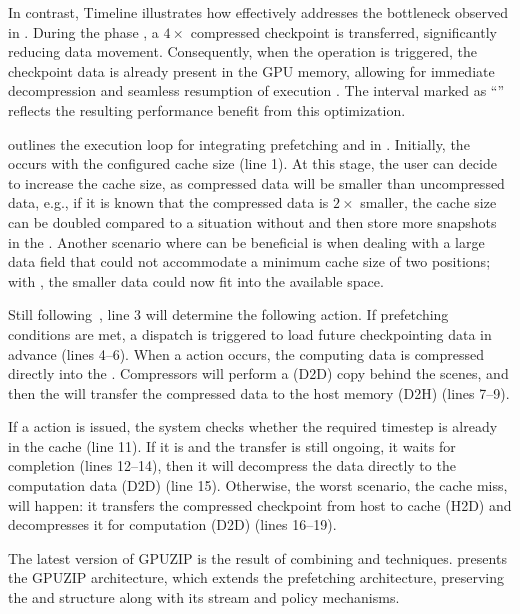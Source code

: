 \documentclass[Ingles]{ic-tese-v3}
\begin{document}
In contrast, Timeline  illustrates how \compression effectively addresses the bottleneck observed in . During the  phase , a $4\times$ compressed checkpoint is transferred, significantly reducing \htd data movement. Consequently, when the \restore operation  is triggered, the checkpoint data is already present in the GPU memory, allowing for immediate decompression and seamless resumption of execution . The interval marked as ``'' reflects the resulting performance benefit from this optimization.

 outlines the execution loop for integrating prefetching and \compression in \awave. Initially, the  occurs with the configured cache size (line 1). At this stage, the user can decide to increase the cache size, as compressed data will be smaller than uncompressed data, e.g., if it is known that the compressed data is $2\times$ smaller, the cache size can be doubled compared to a situation without \compression and then store more snapshots in the \cache. Another scenario where \compression can be beneficial is when dealing with a large data field that could not accommodate a minimum cache size of two positions; with \compression, the smaller data could now fit into the available space.

Still following~, line 3 will determine the following \checkpointing action. If prefetching conditions are met, a dispatch is triggered to load future checkpointing data in advance (lines 4–6). When a \save action occurs, the computing data is compressed directly into the \cache. Compressors will perform a \dtd (D2D) copy behind the scenes, and then the \cache will transfer the compressed data to the host memory (D2H) (lines 7–9). 

If a \restore action is issued, the system checks whether the required timestep is already in the cache (line 11). If it is and the transfer is still ongoing, it waits for completion (lines 12–14), then it will decompress the data directly to the computation data (D2D) (line 15). Otherwise, the worst scenario, the cache miss, will happen: it transfers the compressed checkpoint from host to cache (H2D) and decompresses it for computation (D2D) (lines 16–19).

The latest version of GPUZIP is the result of combining \compression and \prefetching techniques.  presents the GPUZIP architecture, which extends the prefetching architecture, preserving the \cache and \pool structure along with its stream and policy mechanisms.
\end{document}
